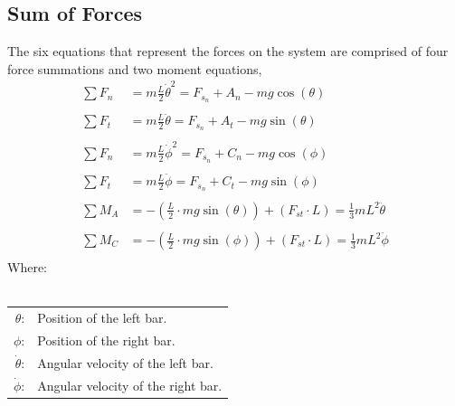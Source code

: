 \documentclass[12pt]{report}
\newcommand{\eqname}[1]{\tag*{#1}}%
\begin{document}
\begin{flushleft}
\section{Sum of Forces}
The six equations that represent the forces on the system are comprised of four force summations and two moment equations,
\begin{align}
  \sum F_n &= m\frac{L}{2}\dot{\theta}^2 = F_{s_n} + A_n - mg\cos(\theta) \label{force_left_bar_theta_normal} \\ \eqname{Sum of Normal Forces on the left bar ($\theta$)} \\
  \sum F_t &= m\frac{L}{2}\ddot{\theta} = F_{s_n} + A_t- mg\sin(\theta) \label{force_left_bar_theta_tangential} \\ \eqname{Sum of Tangential Forces on the left bar ($\theta$)} \\
  \sum F_n &= m\frac{L}{2}\dot{\phi}^2 = F_{s_n} + C_n - mg\cos(\phi) \label{force_right_bar_phi_normal} \\ \eqname{Sum of Normal Forces on the right bar ($\phi$)} \\
  \sum F_t &= m\frac{L}{2}\ddot{\phi} = F_{s_n} + C_t- mg\sin(\phi) \label{force_right_bar_phi_tangential} \\ \eqname{Sum of Tangential Forces on the right bar ($\phi$)} \\
  \sum M_A &= -\left(\frac{L}{2} \cdot mg\sin(\theta)\right) + \left(F_{st} \cdot L\right) = \frac{1}{3}mL^2\ddot{\theta} \label{moment_left_bar_theta} \\ \eqname{Sum of Moments about A ($\theta$)} \\
  \sum M_C &= -\left(\frac{L}{2} \cdot mg\sin(\phi)\right)+\left(F_{st} \cdot L\right) = \frac{1}{3}mL^2\ddot{\phi} \label{moment_right_bar_theta} \\ \eqname{Sum of Moments about C ($\phi$)}
\end{align}
Where: \\
~\\
\begin{tabular}{rl}
$\theta$:& Position of the left bar. \\
$\phi$:& Position of the right bar. \\
$\dot{\theta}$:& Angular velocity of the left bar. \\
$\dot{\phi}$:& Angular velocity of the right bar. \\

\end{tabular}
\end{flushleft}
\end{document}
